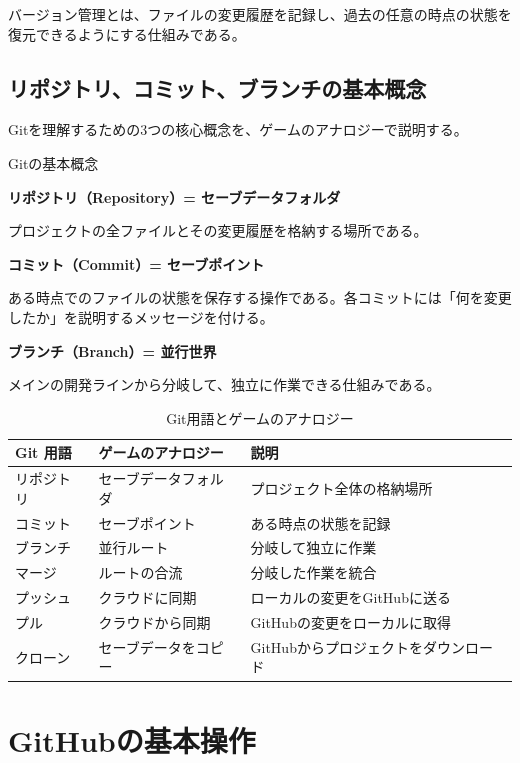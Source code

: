 バージョン管理とは、ファイルの変更履歴を記録し、過去の任意の時点の状態を復元できるようにする仕組みである。

\subsection{リポジトリ、コミット、ブランチの基本概念}

Gitを理解するための3つの核心概念を、ゲームのアナロジーで説明する。

\begin{itembox}[l]{Gitの基本概念}

\textbf{リポジトリ（Repository）= セーブデータフォルダ}

プロジェクトの全ファイルとその変更履歴を格納する場所である。

\textbf{コミット（Commit）= セーブポイント}

ある時点でのファイルの状態を保存する操作である。各コミットには「何を変更したか」を説明するメッセージを付ける。

\textbf{ブランチ（Branch）= 並行世界}

メインの開発ラインから分岐して、独立に作業できる仕組みである。
\end{itembox}

\begin{table}[H]
\centering
\caption{Git用語とゲームのアナロジー}
\small
\begin{tabular}{lll}
\toprule
Git 用語 & ゲームのアナロジー & 説明 \\
\midrule
リポジトリ & セーブデータフォルダ & プロジェクト全体の格納場所 \\
コミット & セーブポイント & ある時点の状態を記録 \\
ブランチ & 並行ルート & 分岐して独立に作業 \\
マージ & ルートの合流 & 分岐した作業を統合 \\
プッシュ & クラウドに同期 & ローカルの変更をGitHubに送る \\
プル & クラウドから同期 & GitHubの変更をローカルに取得 \\
クローン & セーブデータをコピー & GitHubからプロジェクトをダウンロード \\
\bottomrule
\end{tabular}
\end{table}

\section{GitHubの基本操作}

